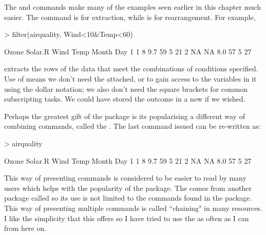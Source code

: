 The  and  commands make many of the examples seen earlier in this chapter much easier. The  command is for extraction, while  is for rearrangement. For example,
\begin{Schunk}
\begin{Sinput}
> filter(airquality, Wind<10&Temp<60)
\end{Sinput}
\begin{Soutput}
  Ozone Solar.R Wind Temp Month Day
1     1       8  9.7   59     5  21
2    NA      NA  8.0   57     5  27
\end{Soutput}
\end{Schunk}
extracts the rows of the  data that meet the combinations of conditions specified. 
Use of  means we don't need the  attached, or to gain access to the variables in it using the dollar notation; we also don't need the square brackets for common subscripting tasks. We could have stored the outcome in a new  if we wished.

Perhaps the greatest gift of the  package is its popularising a different way of combining commands, called the . The last command issued can be re-written as:
\begin{Schunk}
\begin{Sinput}
> airquality %>% filter(Wind<10&Temp<60)
\end{Sinput}
\begin{Soutput}
  Ozone Solar.R Wind Temp Month Day
1     1       8  9.7   59     5  21
2    NA      NA  8.0   57     5  27
\end{Soutput}
\end{Schunk}
This way of presenting commands is considered to be easier to read by many users which helps with the popularity of the   package. The  comes from another package called  so its use is not limited to the commands found in the  package. 
This way of presenting multiple commands is called ``chaining" in many resources. I like the simplicity that this offers so I have tried to use the  as often as I can from here on.
 
